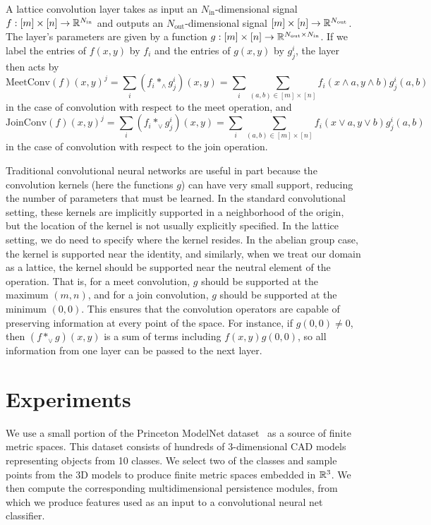 \documentclass{article}
\begin{document}
A lattice convolution layer takes as input an $N_{\text{in}}$-dimensional signal
$f : [m] \times [n] \to \mathbb{R}^{N_{\text{in}}}$ and outputs an
$N_{\text{out}}$-dimensional signal $ [m] \times [n] \to
\mathbb{R}^{N_{\text{out}}}$. The layer's parameters are given by a function $g: [m]
\times [n] \to \mathbb{R}^{N_{\text{out}}\times N_{\text{in}}}$. If we label the
entries of $f(x,y)$ by $f_i$ and the entries of $g(x,y)$ by $g^i_j$, the layer then acts by
\[\text{MeetConv}(f)(x,y)^j = \sum_{i} (f_i \ast_{\wedge} g^i_j)(x,y) = \sum_i
  \sum_{(a,b) \in [m]\times [n]} f_i(x \wedge a, y \wedge b)g^i_j(a,b)\]
in the case of convolution with respect to the meet operation, and
\[\text{JoinConv}(f)(x,y)^j = \sum_{i} (f_i \ast_{\vee} g^i_j)(x,y) = \sum_i
  \sum_{(a,b) \in [m]\times [n]} f_i(x \vee a, y \vee b)g^i_j(a,b)\]
in the case of convolution with respect to the join operation.

Traditional convolutional neural networks are useful in part because the
convolution kernels (here the functions $g$) can have very small support,
reducing the number of parameters that must be learned. In the standard
convolutional setting, these kernels are implicitly supported in a neighborhood
of the origin, but the location of the kernel is not usually explicitly
specified. In the lattice setting, we do need to specify where the kernel
resides. In the abelian group case, the kernel is supported near the identity,
and similarly, when we treat our domain as a lattice, the kernel should be
supported near the neutral element of the operation. That is, for a meet
convolution, $g$ should be supported at the maximum $(m,n)$, and for a join
convolution, $g$ should be supported at the minimum $(0,0)$. This ensures that
the convolution operators are capable of preserving information at every point
of the space. For instance, if $g(0,0) \neq 0$, then $(f \ast_{\vee} g)(x,y)$ is
a sum of terms including $f(x,y)g(0,0)$, so all information from one layer can
be passed to the next layer. 
\section{Experiments}
We use a small portion of the Princeton ModelNet
dataset~\cite{zhirong_wu_3d_2015} as a source of finite
metric spaces. This dataset consists of hundreds of 3-dimensional CAD models
representing objects from 10 classes. We select two of the classes and sample
points from the 3D models to produce finite metric spaces embedded in $\mathbb{R}^3$.
We then compute the corresponding multidimensional persistence modules, from
which we produce features used as an input to a convolutional neural net
classifier.
\end{document}
